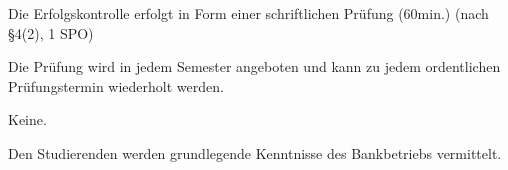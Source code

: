 \begin{course}

\setdoclanguagegerman
{}



\coursehead


\label{cour_6423.dp_997}


\begin{styleenv}
\begin{assessment}
Die Erfolgskontrolle erfolgt in Form einer schriftlichen Prüfung (60min.) (nach §4(2), 1 SPO)

 

Die Prüfung wird in jedem Semester angeboten und kann zu jedem ordentlichen Prüfungstermin wiederholt werden.


\end{assessment}

\begin{conditions}Keine.\end{conditions}


\end{styleenv}

\begin{learningoutcomes}
Den Studierenden werden grundlegende Kenntnisse des Bankbetriebs vermittelt.


\end{learningoutcomes}


\end{course}
